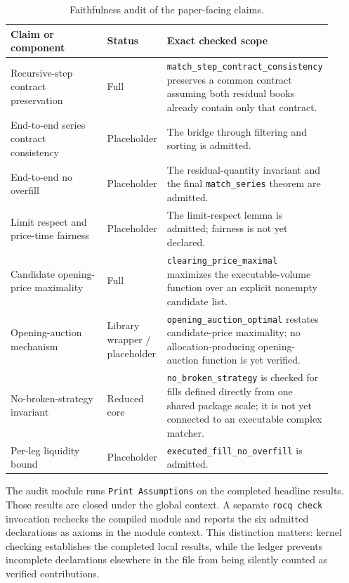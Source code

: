 \documentclass[11pt]{article}
\begin{document}
\begin{table}[ht]
\centering
\small
\begin{tabular}{
  >{\raggedright\arraybackslash}p{0.30\linewidth}
  >{\raggedright\arraybackslash}p{0.18\linewidth}
  >{\raggedright\arraybackslash}p{0.43\linewidth}}
\toprule
Claim or component & Status & Exact checked scope \\
\midrule
Recursive-step contract preservation & Full &
\texttt{match\_step\_contract\_consistency} preserves a common contract assuming both residual books already contain only that contract. \\
End-to-end series contract consistency & Placeholder &
The bridge through filtering and sorting is admitted. \\
End-to-end no overfill & Placeholder &
The residual-quantity invariant and the final \texttt{match\_series} theorem are admitted. \\
Limit respect and price-time fairness & Placeholder &
The limit-respect lemma is admitted; fairness is not yet declared. \\
Candidate opening-price maximality & Full &
\texttt{clearing\_price\_maximal} maximizes the executable-volume function over an explicit nonempty candidate list. \\
Opening-auction mechanism & Library wrapper / placeholder &
\texttt{opening\_auction\_optimal} restates candidate-price maximality; no allocation-producing opening-auction function is yet verified. \\
No-broken-strategy invariant & Reduced core &
\texttt{no\_broken\_strategy} is checked for fills defined directly from one shared package scale; it is not yet connected to an executable complex matcher. \\
Per-leg liquidity bound & Placeholder &
\texttt{executed\_fill\_no\_overfill} is admitted. \\
\bottomrule
\end{tabular}
\caption{Faithfulness audit of the paper-facing claims.}
\label{tab:audit}
\end{table}

The audit module runs \texttt{Print Assumptions} on the completed headline results. Those results are closed under the global context. A separate \texttt{rocq check} invocation rechecks the compiled module and reports the six admitted declarations as axioms in the module context. This distinction matters: kernel checking establishes the completed local results, while the ledger prevents incomplete declarations elsewhere in the file from being silently counted as verified contributions.
\end{document}
